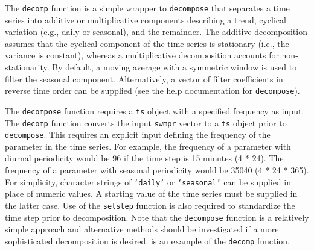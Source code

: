 \documentclass[10pt,letterpaper]{article}\usepackage[]{graphicx}\usepackage[]{color}
\begin{document}
The \texttt{decomp} function is a simple wrapper to \texttt{decompose} that separates a time series into additive or multiplicative components describing a trend, cyclical variation (e.g., daily or seasonal), and the remainder.  The additive decomposition assumes that the cyclical component of the time series is stationary (i.e., the variance is constant), whereas a multiplicative decomposition accounts for non-stationarity.  By default, a moving average with a symmetric window is used to filter the seasonal component.  Alternatively, a vector of filter coefficients in reverse time order can be supplied (see the help documentation for \texttt{decompose}).  

The \texttt{decompose} function requires a \texttt{ts} object with a specified frequency as input.  The \texttt{decomp} function converts the input \texttt{swmpr} vector to a \texttt{ts} object prior to \texttt{decompose}.  This requires an explicit input defining the frequency of the parameter in the time series.  For example, the frequency of a parameter with diurnal periodicity would be 96 if the time step is 15 minutes (4 * 24).  The frequency of a parameter with seasonal periodicity would be 35040 (4 * 24 * 365).  For simplicity, character strings of \texttt{`daily'} or \texttt{`seasonal'} can be supplied in place of numeric values.  A starting value of the time series must be supplied in the latter case.  Use of the \texttt{setstep} function is also required to standardize the time step prior to decomposition.  Note that the \texttt{decompose} function is a relatively simple approach and alternative methods should be investigated if a more sophisticated decomposition is desired.   is an example of the \texttt{decomp} function.
\end{document}
